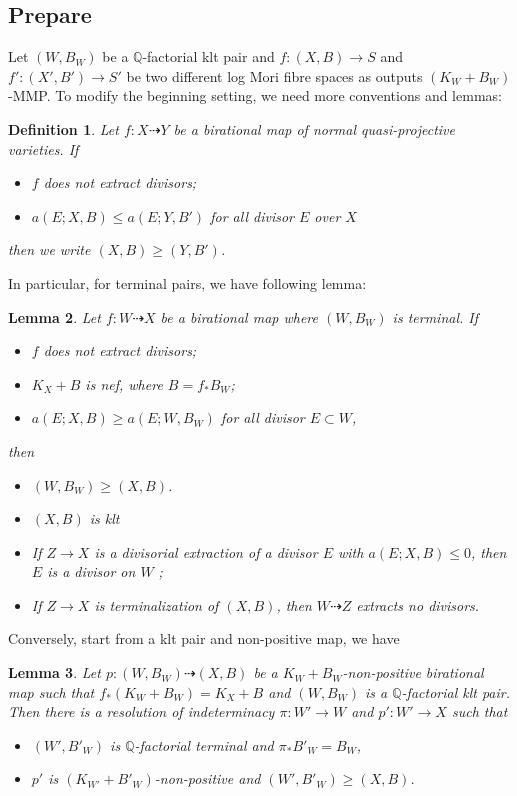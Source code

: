 \documentclass{article}
\newtheorem{defn}{Definition}[subsection]
\newtheorem{lem}[defn]{Lemma}
\begin{document}
\subsection{Prepare}
Let $(W,B_W)$ be a $\mathbb{Q}$-factorial klt pair and $f:(X,B)\to S$ and $f':(X',B')\to S'$ be two different log Mori fibre spaces as outputs $(K_{W}+B_{W})$-MMP.  To modify the beginning setting, we need more conventions and lemmas:
\begin{defn}
Let $f:X\dashrightarrow Y$ be a birational map of normal quasi-projective varieties. If
\begin{itemize}
  \item $f$ does not extract divisors;
  \item $a(E;X,B)\leqslant a(E;Y,B')$ for all divisor  $E$  over $X$ 
\end{itemize}
then we write $(X,B)\geqslant (Y,B')$.
\end{defn}
In particular, for terminal pairs, we have following lemma: 
\begin{lem}
Let $f:W\dashrightarrow X$ be a birational map where $(W,B_W)$ is terminal. If
\begin{itemize}
  \item $f$ does not extract divisors;
  \item $K_X+B$ is nef, where $B=f_*B_W$;
  \item $a(E;X,B)\geqslant a(E;W,B_W)$ for all divisor $E \subset W$,
\end{itemize}
then
\begin{itemize}
  \item $(W,B_W)\geqslant (X,B)$.
  \item $(X,B)$ is klt
  \item If $Z\to X$ is a divisorial extraction of a divisor $E$ with $a(E;X,B)\leqslant 0$, then $E$ is a divisor on $W$ ;
  \item If $Z\to X$ is terminalization of $(X,B)$, then $W\dashrightarrow Z$ extracts no divisors.
\end{itemize}
\end{lem}
Conversely, start from a klt pair and non-positive map, we have
\begin{lem}
Let $p:(W,B_W)\dashrightarrow (X,B)$ be a $K_W+B_W$-non-positive birational map such that $f_*(K_W+B_W)=K_X+B$ and $(W,B_W)$ is a $\mathbb{Q}$-factorial klt pair. Then there is a resolution of indeterminacy $\pi:W'\to W $ and $p':W'\to X$ such that
\begin{itemize}
  \item $(W',B'_W)$ is $\mathbb{Q}$-factorial terminal and $\pi_*B'_W=B_W$,
  \item $p'$ is $(K_{W'}+B'_W)$-non-positive and $(W',B'_W)\geqslant (X,B)$.
\end{itemize}
\end{lem}
\end{document}
